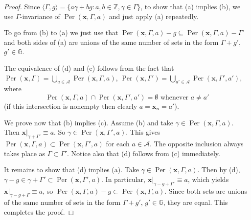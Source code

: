 \documentclass[leqno,a4paper,12pt]{article}
\theoremstyle{definition}
\newcommand{\Per}{\operatorname{Per}\nolimits}
\newcommand{\Z}{{\mathbb{Z}}}
\newcommand{\G}{\mathbb{G}}
\begin{document}
\begin{proof}
Since $\langle\Gamma,g\rangle=\{a\gamma+b g:  a,b\in\Z, \gamma\in\Gamma\}$, to show that (a) implies (b), we use $\Gamma$-invariance of $\Per(\bm{x},\Gamma,a)$ and just apply (a) repeatedly.

To go from (b) to (a) we just use that $\Per(\bm{x},\Gamma,a)-g\subseteq\Per(\bm{x},\Gamma,a)-\Gamma'$ and both sides of (a) are unions of the same number of sets in the form $\Gamma+g'$, $g'\in\G$.

The equivalence of (d) and (e) follows from the fact that $\Per(\bm{x},\Gamma)=\bigcup_{a\in\mathcal{A}}\Per(\bm{x},\Gamma,a)$, $\Per(\bm{x},\Gamma')=\bigcup_{a'\in\mathcal{A}}\Per(\bm{x},\Gamma',a')$, where
\[
\Per(\bm{x},\Gamma,a)\cap\Per(\bm{x},\Gamma',a')=\emptyset \text{ whenever }a\neq a'
\]
(if this intersection is nonempty then clearly $a=\bm{x}_n=a'$).

We prove now that (b) implies (c). Assume (b) and take $\gamma\in \Per(\bm{x},\Gamma,a)$. Then $\bm{x}|_{\gamma+\Gamma'}\equiv a$. So $\gamma\in\Per(\bm{x},\Gamma',a)$. This gives $\Per(\bm{x},\Gamma,a)\subset \Per(\bm{x},\Gamma',a)$ for each $a\in \mathcal{A}$. The opposite inclusion always takes place as $\Gamma\subset\Gamma'$. Notice also that (d) follows from (c) immediately.

It remains to show that (d) implies (a). Take $\gamma\in\Per(\bm{x},\Gamma,a)$. Then by (d), $\gamma-g\in\gamma+\Gamma'\subset\Per(\bm{x},\Gamma',a)$. In particular, $\bm{x}|_{\gamma-g+\Gamma'}\equiv a$, which yields $\bm{x}|_{\gamma-g+\Gamma}\equiv a$, so $\Per(\bm{x},\Gamma,a)-g\subset\Per(\bm{x},\Gamma,a)$. Since both sets are unions of the same number of sets in the form $\Gamma+g'$, $g'\in\G$, they are equal. This completes the proof.
\end{proof}
\end{document}
